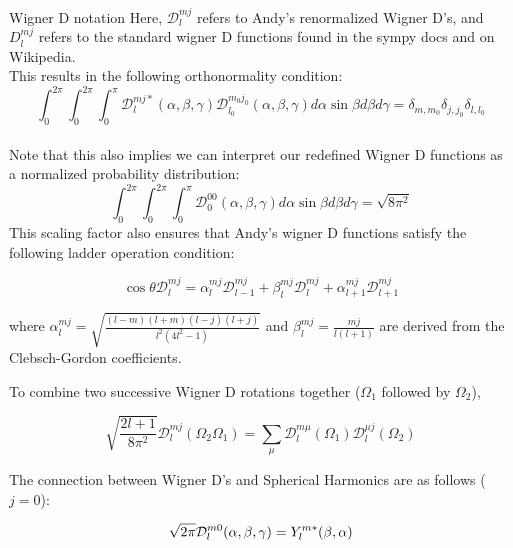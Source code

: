 \documentclass[11pt]{article}
\begin{document}
\begin{flushleft}
\begin{section}{Wigner D notation}
Here, ${\mathcal{D}}^{mj}_{l}$ refers to Andy's renormalized Wigner D's, and $D^{mj}_{l}$ refers to the standard wigner D functions found in the sympy docs and on Wikipedia.\\
\vspace{\baselineskip}
This results in the following orthonormality condition:
    \begin{equation*}
    \int_0^{2\pi}\int_0^{2\pi}\int_0^{\pi}{\mathcal{D}}^{mj*}_{l}(\alpha,\beta,\gamma)
    {\mathcal{D}}^{m_0j_0}_{l_0}(\alpha,\beta,\gamma) d\alpha \sin\beta d\beta d\gamma =
    \delta_{m,m_0}\delta_{j,j_0}\delta_{l,l_0}
    \end{equation*}\\
\vspace{\baselineskip}
Note that this also implies we can interpret our redefined Wigner D functions as a normalized probability distribution:
	\begin{equation*}
    \int_0^{2\pi}\int_0^{2\pi}\int_0^{\pi}{\mathcal{D}}^{00}_{0}(\alpha,\beta,\gamma) d\alpha \sin\beta d\beta d\gamma = \sqrt{8\pi^2}
    \end{equation*}
This scaling factor also ensures that Andy's wigner D functions satisfy the following ladder operation condition:

    \begin{equation*}
    \cos{\theta}{\mathcal{D}}^{mj}_{l} = \alpha^{mj}_{l}{\mathcal{D}}^{mj}_{l-1} +
    \beta^{mj}_{l}{\mathcal{D}}^{mj}_{l} + \alpha^{mj}_{l+1}{\mathcal{D}}^{mj}_{l+1}
    \end{equation*}

where $\alpha^{mj}_{l}=\sqrt{\frac{(l-m)(l+m)(l-j)(l+j)}{l^2(4l^2-1)}}$ and $\beta^{mj}_{l}=\frac{mj}{l(l+1)}$ are derived from the Clebsch-Gordon coefficients.\\
\vspace{\baselineskip}

To combine two successive Wigner D rotations together ($\Omega_1$ followed by
$\Omega_2$),

    \begin{equation*}
    \sqrt{\frac{2l+1}{8\pi^2}}{\mathcal{D}}^{mj}_{l}(\Omega_2\Omega_1) = \sum_{\mu}{\mathcal{D}}^{m\mu}_{l}(\Omega_1){\mathcal{D}}^{\mu j}_{l}(\Omega_2)
    \end{equation*}

The connection between Wigner D's and Spherical Harmonics are as follows ($j=0$):

    \begin{equation*}
    \sqrt{2\pi}\wigD{l}{m}{0}(\alpha, \beta, \gamma) = \sharm{l}{m*}(\beta, \alpha)
    \end{equation*}


\end{section}
\end{flushleft}
\end{document}
